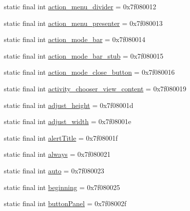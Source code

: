 \begin{DoxyCompactItemize}
\item 
static final int \mbox{\hyperlink{classcom_1_1google_1_1android_1_1gms_1_1R_1_1id_a42e430cd1f0e8d06226811ce5130e9f8}{action\+\_\+menu\+\_\+divider}} = 0x7f080012
\item 
static final int \mbox{\hyperlink{classcom_1_1google_1_1android_1_1gms_1_1R_1_1id_add1971bd37ff128db6df22ec6b4037ec}{action\+\_\+menu\+\_\+presenter}} = 0x7f080013
\item 
static final int \mbox{\hyperlink{classcom_1_1google_1_1android_1_1gms_1_1R_1_1id_a2dd0d3062134e90334a051754a58c040}{action\+\_\+mode\+\_\+bar}} = 0x7f080014
\item 
static final int \mbox{\hyperlink{classcom_1_1google_1_1android_1_1gms_1_1R_1_1id_ac4480c4732dd963dcf21da482439f08e}{action\+\_\+mode\+\_\+bar\+\_\+stub}} = 0x7f080015
\item 
static final int \mbox{\hyperlink{classcom_1_1google_1_1android_1_1gms_1_1R_1_1id_a9ff020ad343c3d02ad97572730c1714e}{action\+\_\+mode\+\_\+close\+\_\+button}} = 0x7f080016
\item 
static final int \mbox{\hyperlink{classcom_1_1google_1_1android_1_1gms_1_1R_1_1id_a5439e69740c7d7b7a222285e6ae428b0}{activity\+\_\+chooser\+\_\+view\+\_\+content}} = 0x7f080019
\item 
static final int \mbox{\hyperlink{classcom_1_1google_1_1android_1_1gms_1_1R_1_1id_a7e9257fd907116c382601ccecc69b68c}{adjust\+\_\+height}} = 0x7f08001d
\item 
static final int \mbox{\hyperlink{classcom_1_1google_1_1android_1_1gms_1_1R_1_1id_a41f5bc7e4b2c2eb8a55532c95ac192ce}{adjust\+\_\+width}} = 0x7f08001e
\item 
static final int \mbox{\hyperlink{classcom_1_1google_1_1android_1_1gms_1_1R_1_1id_acecfba9b7db2d8b46c82c06c294d1330}{alert\+Title}} = 0x7f08001f
\item 
static final int \mbox{\hyperlink{classcom_1_1google_1_1android_1_1gms_1_1R_1_1id_a18e83e110895bf53ed2b543357e90d49}{always}} = 0x7f080021
\item 
static final int \mbox{\hyperlink{classcom_1_1google_1_1android_1_1gms_1_1R_1_1id_a044e1d2905a305bfdbbb31222323dc86}{auto}} = 0x7f080023
\item 
static final int \mbox{\hyperlink{classcom_1_1google_1_1android_1_1gms_1_1R_1_1id_a7e67b5c39d966ff5eee0302aba236d6d}{beginning}} = 0x7f080025
\item 
static final int \mbox{\hyperlink{classcom_1_1google_1_1android_1_1gms_1_1R_1_1id_af3dd78b43eec8ed7cd49a648535980b4}{button\+Panel}} = 0x7f08002f

\end{DoxyCompactItemize}
